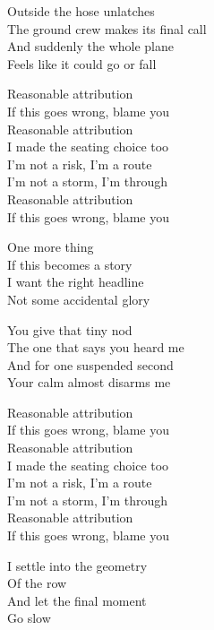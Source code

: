 \begin{lyrics}
Outside the hose unlatches\\
The ground crew makes its final call\\
And suddenly the whole plane\\
Feels like it could go or fall

Reasonable attribution\\
If this goes wrong, blame you\\
Reasonable attribution\\
I made the seating choice too\\
I'm not a risk, I'm a route\\
I'm not a storm, I'm through\\
Reasonable attribution\\
If this goes wrong, blame you

One more thing\\
If this becomes a story\\
I want the right headline\\
Not some accidental glory

You give that tiny nod\\
The one that says you heard me\\
And for one suspended second\\
Your calm almost disarms me

Reasonable attribution\\
If this goes wrong, blame you\\
Reasonable attribution\\
I made the seating choice too\\
I'm not a risk, I'm a route\\
I'm not a storm, I'm through\\
Reasonable attribution\\
If this goes wrong, blame you

I settle into the geometry\\
Of the row\\
And let the final moment\\
Go slow
\end{lyrics}

